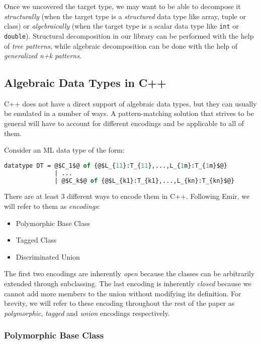 \documentclass[preprint]{sigplanconf}
\makeatletter
\DeclareRobustCommand{\code}[1]{{\lstinline[breaklines=false,escapechar=@]{#1}}}
\makeatother
\begin{document}
Once we uncovered the target type, we may want to be able to decompose it 
\emph{structurally} (when the target type is a \emph{structured} data type like 
array, tuple or class) or \emph{algebraically} (when the target type is a scalar 
data type like \code{int} or \code{double}). Structural decomposition in our 
library can be performed with the help of \emph{tree patterns}, while algebraic 
decomposition can be done with the help of \emph{generalized n+k patterns}.

\subsection{Algebraic Data Types in C++}
\label{sec:adt}

C++ does not have a direct support of algebraic data types, but they can usually 
be emulated in a number of ways. A pattern-matching solution that strives to be 
general will have to account for different encodings and be applicable to all of 
them.

Consider an ML data type of the form:

\begin{lstlisting}[language=ML,keepspaces,columns=flexible,escapechar=@]
datatype DT = @$C_1$@ of {@$L_{11}:T_{11},...,L_{1m}:T_{1m}$@} 
              | ...
              | @$C_k$@ of {@$L_{k1}:T_{k1},...,L_{kn}:T_{kn}$@}
\end{lstlisting}

\noindent There are at least 3 different ways to encode them in C++. Following 
Emir, we will refer to them as \emph{encodings}:

\begin{itemize}
\item Polymorphic Base Class
\item Tagged Class
\item Discriminated Union
\end{itemize}

The first two encodings are inherently \emph{open} because the classes can be 
arbitrarily extended through subclassing. The last encoding is inherently 
\emph{closed} because we cannot add more members to the union without modifying 
its definition. For brevity, we will refer to these encoding throughout the rest 
of the paper as \emph{polymorphic}, \emph{tagged} and \emph{union} encodings 
respectively.

\subsubsection{Polymorphic Base Class}
\label{sec:pbc}
\end{document}
